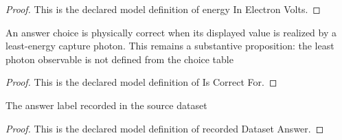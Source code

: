 \begin{proof}
  This is the declared model definition of energy In Electron Volts.
\end{proof}
\begin{definition}
  \label{def:physics:phyx-mini-0585:phyxminiproblems-problemphyxmini0585-answerchoice-iscorrectfor}
  An answer choice is physically correct when its displayed value is realized by a least-energy capture photon. This remains a substantive proposition: the least photon observable is not defined from the choice table
\end{definition}
\begin{proof}
  This is the declared model definition of Is Correct For.
\end{proof}
\begin{definition}
  \label{def:physics:phyx-mini-0585:phyxminiproblems-problemphyxmini0585-recordeddatasetanswer}
  The answer label recorded in the source dataset
\end{definition}
\begin{proof}
  This is the declared model definition of recorded Dataset Answer.
\end{proof}
